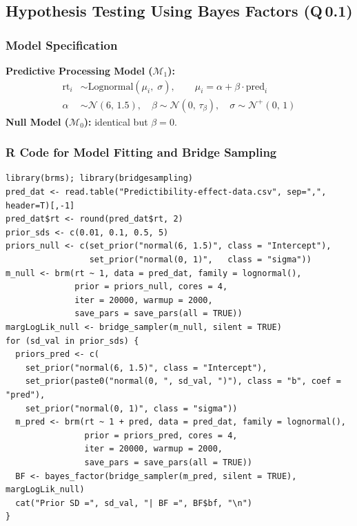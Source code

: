 \documentclass[12pt,a4paper]{article}
\begin{document}
\subsection{Hypothesis Testing Using Bayes Factors (Q\,0.1)}

\subsubsection{Model Specification}

\begin{tcolorbox}[modelbox]
\textbf{Predictive Processing Model ($\mathcal{M}_1$):}
\begin{align}
  \text{rt}_i &\sim \mathrm{Lognormal}(\mu_i,\;\sigma), \qquad
  \mu_i = \alpha + \beta\cdot\text{pred}_i \nonumber \\
  \alpha &\sim \mathcal{N}(6,\,1.5),\quad
  \beta  \sim \mathcal{N}(0,\,\tau_\beta),\quad
  \sigma \sim \mathcal{N}^+(0,\,1) \nonumber
\end{align}
\textbf{Null Model ($\mathcal{M}_0$):} identical but $\beta=0$.
\end{tcolorbox}
\vspace{-12pt}
\subsubsection{R Code for Model Fitting and Bridge Sampling}

\begin{lstlisting}
library(brms); library(bridgesampling)
pred_dat <- read.table("Predictibility-effect-data.csv", sep=",", header=T)[,-1]
pred_dat$rt <- round(pred_dat$rt, 2)
prior_sds <- c(0.01, 0.1, 0.5, 5)
priors_null <- c(set_prior("normal(6, 1.5)", class = "Intercept"),
                 set_prior("normal(0, 1)",   class = "sigma"))
m_null <- brm(rt ~ 1, data = pred_dat, family = lognormal(),
              prior = priors_null, cores = 4,
              iter = 20000, warmup = 2000,
              save_pars = save_pars(all = TRUE))
margLogLik_null <- bridge_sampler(m_null, silent = TRUE)
for (sd_val in prior_sds) {
  priors_pred <- c(
    set_prior("normal(6, 1.5)", class = "Intercept"),
    set_prior(paste0("normal(0, ", sd_val, ")"), class = "b", coef = "pred"),
    set_prior("normal(0, 1)", class = "sigma"))
  m_pred <- brm(rt ~ 1 + pred, data = pred_dat, family = lognormal(),
                prior = priors_pred, cores = 4,
                iter = 20000, warmup = 2000,
                save_pars = save_pars(all = TRUE))
  BF <- bayes_factor(bridge_sampler(m_pred, silent = TRUE), margLogLik_null)
  cat("Prior SD =", sd_val, "| BF =", BF$bf, "\n")
}
\end{lstlisting}
\end{document}
